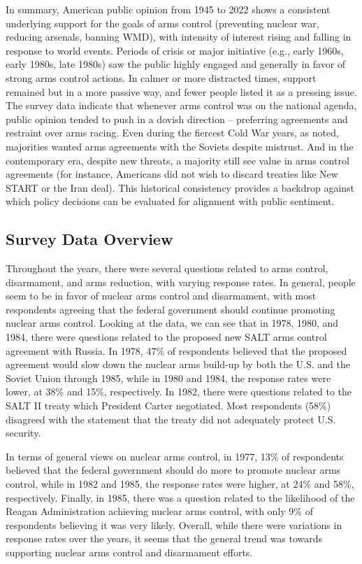 \documentclass[11,5 pt]{article}
\begin{document}
    In summary, American public opinion from 1945 to 2022 shows a consistent underlying support for the goals of arms control (preventing nuclear war, reducing arsenals, banning WMD), with intensity of interest rising and falling in response to world events. Periods of crisis or major initiative (e.g., early 1960s, early 1980s, late 1980s) saw the public highly engaged and generally in favor of strong arms control actions. In calmer or more distracted times, support remained but in a more passive way, and fewer people listed it as a pressing issue. The survey data indicate that whenever arms control was on the national agenda, public opinion tended to push in a dovish direction – preferring agreements and restraint over arms racing. Even during the fiercest Cold War years, as noted, majorities wanted arms agreements with the Soviets despite mistrust. And in the contemporary era, despite new threats, a majority still see value in arms control agreements (for instance, Americans did not wish to discard treaties like New START or the Iran deal). This historical consistency provides a backdrop against which policy decisions can be evaluated for alignment with public sentiment.


\subsection*{Survey Data Overview}
     
    Throughout the years, there were several questions related to arms control, disarmament, and arms reduction, with varying response rates. In general, people seem to be in favor of nuclear arms control and disarmament, with most respondents agreeing that the federal government should continue promoting nuclear arms control. Looking at the data, we can see that in 1978, 1980, and 1984, there were questions related to the proposed new SALT arms control agreement with Russia. In 1978, 47\% of respondents believed that the proposed agreement would slow down the nuclear arms build-up by both the U.S. and the Soviet Union through 1985, while in 1980 and 1984, the response rates were lower, at 38\% and 15\%, respectively. In 1982, there were questions related to the SALT II treaty which President Carter negotiated. Most respondents (58\%) disagreed with the statement that the treaty did not adequately protect U.S. security. 
    
    In terms of general views on nuclear arms control, in 1977, 13\% of respondents believed that the federal government should do more to promote nuclear arms control, while in 1982 and 1985, the response rates were higher, at 24\% and 58\%, respectively.   Finally, in 1985, there was a question related to the likelihood of the Reagan Administration achieving nuclear arms control, with only 9\% of respondents believing it was very likely. Overall, while there were variations in response rates over the years, it seems that the general trend was towards supporting nuclear arms control and disarmament efforts.
\end{document}
